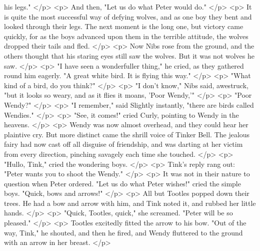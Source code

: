       his legs."
    </p>
    <p>
      And then, "Let us do what Peter would do."
    </p>
    <p>
      It is quite the most successful way of defying wolves, and as one boy they
      bent and looked through their legs. The next moment is the long one, but
      victory came quickly, for as the boys advanced upon them in the terrible
      attitude, the wolves dropped their tails and fled.
    </p>
    <p>
      Now Nibs rose from the ground, and the others thought that his staring
      eyes still saw the wolves. But it was not wolves he saw.
    </p>
    <p>
      "I have seen a wonderfuller thing," he cried, as they gathered round him
      eagerly. "A great white bird. It is flying this way."
    </p>
    <p>
      "What kind of a bird, do you think?"
    </p>
    <p>
      "I don't know," Nibs said, awestruck, "but it looks so weary, and as it
      flies it moans, 'Poor Wendy,'"
    </p>
    <p>
      "Poor Wendy?"
    </p>
    <p>
      "I remember," said Slightly instantly, "there are birds called Wendies."
    </p>
    <p>
      "See, it comes!" cried Curly, pointing to Wendy in the heavens.
    </p>
    <p>
      Wendy was now almost overhead, and they could hear her plaintive cry. But
      more distinct came the shrill voice of Tinker Bell. The jealous fairy had
      now cast off all disguise of friendship, and was darting at her victim
      from every direction, pinching savagely each time she touched.
    </p>
    <p>
      "Hullo, Tink," cried the wondering boys.
    </p>
    <p>
      Tink's reply rang out: "Peter wants you to shoot the Wendy."
    </p>
    <p>
      It was not in their nature to question when Peter ordered. "Let us do what
      Peter wishes!" cried the simple boys. "Quick, bows and arrows!"
    </p>
    <p>
      All but Tootles popped down their trees. He had a bow and arrow with him,
      and Tink noted it, and rubbed her little hands.
    </p>
    <p>
      "Quick, Tootles, quick," she screamed. "Peter will be so pleased."
    </p>
    <p>
      Tootles excitedly fitted the arrow to his bow. "Out of the way, Tink," he
      shouted, and then he fired, and Wendy fluttered to the ground with an
      arrow in her breast.
    </p>
